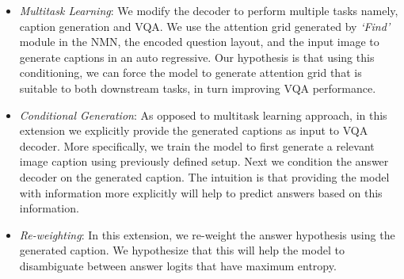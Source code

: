 \begin{itemize}
    \item \textit{Multitask Learning}: We modify the decoder to perform multiple tasks namely, caption generation and VQA. We use the attention grid generated by \textit{`Find'} module in the NMN, the encoded question layout, and the input image to generate captions in an auto regressive. Our hypothesis is that using this conditioning, we can force the model to generate attention grid that is suitable to both downstream tasks, in turn improving VQA performance. %
    
    
    
    \item \textit{Conditional Generation}: As opposed to multitask learning approach, in this extension we explicitly provide the generated captions as input to VQA decoder. More specifically, we train the model to first generate a relevant image caption using  previously defined setup. Next we condition the answer decoder on the generated caption. The intuition is that providing the model with information more explicitly will help to predict answers based on this information. 
    
    
    \item \textit{Re-weighting}: In this extension, we re-weight the answer hypothesis using the generated caption. We hypothesize that this will help the model to disambiguate between answer logits that have maximum entropy. 
    

\end{itemize}
